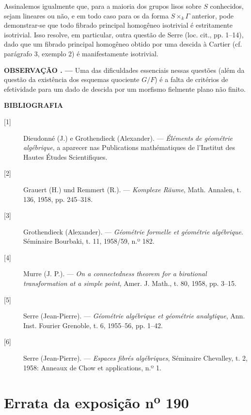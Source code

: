 \documentclass[11pt,twoside,openany]{book}
\numberwithin{equation}{section}
\newcommand{\src}[1]{%
  \phantomsection\hypertarget{src:#1}{}%
  \marginpar{\raggedleft\footnotesize\sffamily #1}%
}
\newcommand{\sid}[1]{\phantomsection\hypertarget{fga:#1}{}}
\theoremstyle{plain}
\theoremstyle{definition}
\theoremstyle{remark}
\newcommand{\result}[2]{%
  \par\medskip\noindent\textbf{#1%
  \if\relax\detokenize{#2}\relax\else\space#2\fi. ---}\enspace
}
\newcommand{\FgaUnitKey}{frontmatter}
\renewcommand{\src}[1]{%
  \phantomsection\hypertarget{src:\FgaUnitKey:#1}{}%
  \marginpar{\raggedleft\footnotesize\sffamily #1}%
}
\begin{document}
Assinalemos igualmente que, para a maioria dos grupos lisos sobre $S$ conhecidos,
sejam lineares ou não, e em todo caso para os da forma
$S\times_k\Gamma$ anterior, pode demonstrar-se que todo fibrado principal
homogêneo isotrivial é estritamente isotrivial. Isso resolve, em particular,
outra questão de Serre (loc. cit., pp. 1--14), dado que um fibrado principal
homogêneo obtido por uma descida à Cartier (cf. parágrafo 3, exemplo 2) é
manifestamente isotrivial.

\result{OBSERVAÇÃO}{} Uma das dificuldades essenciais nessas questões
(além da questão da existência dos esquemas quociente $G/F$) é a
falta de critérios de efetividade para um dado de descida por um morfismo
fielmente plano não finito.

\src{327}
\begin{center}
  \textbf{BIBLIOGRAFIA}
\end{center}

\begin{description}
  \item[{[1]}] Dieudonné (J.) e Grothendieck (Alexander). --- \emph{Éléments
    de géométrie algébrique}, a aparecer nas Publications
    mathématiques de l'Institut des Hautes Études Scientifiques.
  \item[{[2]}] Grauert (H.) und Remmert (R.). --- \emph{Komplexe Räume}, Math.
    Annalen, t. 136, 1958, pp. 245--318.
  \item[{[3]}] Grothendieck (Alexander). --- \emph{Géométrie formelle et
    géométrie algébrique}. Séminaire Bourbaki, t. 11, 1958/59, n.º 182.
  \item[{[4]}] Murre (J. P.). --- \emph{On a connectedness theorem for a
    birational transformation at a simple point}, Amer. J. Math., t. 80, 1958,
    pp. 3--15.
  \item[{[5]}] Serre (Jean-Pierre). --- \emph{Géométrie algébrique et géométrie
    analytique}, Ann. Inst. Fourier Grenoble, t. 6, 1955--56, pp. 1--42.
  \item[{[6]}] Serre (Jean-Pierre). --- \emph{Espaces fibrés algébriques},
    Séminaire Chevalley, t. 2, 1958: Anneaux de Chow et applications, n.º 1.
\end{description}

\par

\def\FgaUnitKey{e190}\clearpage
\chapter*{Errata da exposição n\textsuperscript{o} 190}
\setcounter{footnote}{0}
\sid{e190}
\src{300}
\end{document}
